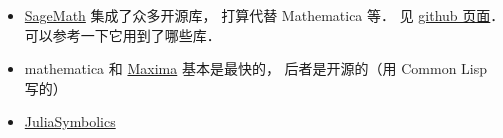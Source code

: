 
\begin{issues}
\issueDraft
\end{issues}

\begin{itemize}
\item \href{https://www.sagemath.org/}{SageMath} 集成了众多开源库， 打算代替 Mathematica 等． 见 \href{https://github.com/sagemath/sage/}{github 页面}． 可以参考一下它用到了哪些库．
\item mathematica 和 \href{https://maxima.sourceforge.io/}{Maxima} 基本是最快的， 后者是开源的（用 Common Lisp 写的）
\item \href{https://juliasymbolics.org/}{JuliaSymbolics}
\end{itemize}
